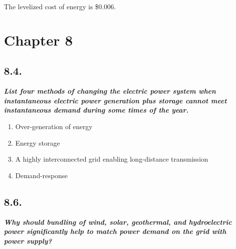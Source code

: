 \documentclass[
  letterpaper,
  DIV=11,
  numbers=noendperiod]{scrartcl}
\newenvironment{Shaded}{\begin{snugshade}}{\end{snugshade}}
\newcommand{\BuiltInTok}[1]{\textcolor[rgb]{0.00,0.23,0.31}{#1}}
\newcommand{\CommentTok}[1]{\textcolor[rgb]{0.37,0.37,0.37}{#1}}
\newcommand{\NormalTok}[1]{\textcolor[rgb]{0.00,0.23,0.31}{#1}}
\newcommand{\OperatorTok}[1]{\textcolor[rgb]{0.37,0.37,0.37}{#1}}
\newcommand{\SpecialCharTok}[1]{\textcolor[rgb]{0.37,0.37,0.37}{#1}}
\newcommand{\SpecialStringTok}[1]{\textcolor[rgb]{0.13,0.47,0.30}{#1}}
\providecommand{\tightlist}{%
  \setlength{\itemsep}{0pt}\setlength{\parskip}{0pt}}\usepackage{longtable,booktabs,array}
\begin{document}
\begin{Shaded}
\end{Shaded}

The levelized cost of energy is \$0.006.

\hypertarget{chapter-8}{%
\section{Chapter 8}\label{chapter-8}}

\hypertarget{section-11}{%
\subsection{8.4.}\label{section-11}}

\textbf{\emph{List four methods of changing the electric power system
when instantaneous electric power generation plus storage cannot meet
instantaneous demand during some times of the year.}}

\begin{enumerate}
\def\labelenumi{\arabic{enumi}.}
\tightlist
\item
  Over-generation of energy
\item
  Energy storage
\item
  A highly interconnected grid enabling long-distance transmission
\item
  Demand-response
\end{enumerate}

\hypertarget{section-12}{%
\subsection{8.6.}\label{section-12}}

\textbf{\emph{Why should bundling of wind, solar, geothermal, and
hydroelectric power significantly help to match power demand on the grid
with power supply?}}
\end{document}
